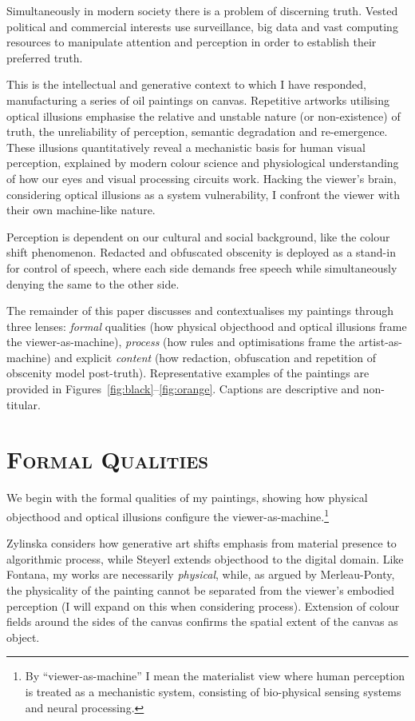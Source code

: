 \documentclass[12pt]{article}
\begin{document}
Simultaneously in modern society there is a problem of discerning
truth.\autocite{keyes2004posttruth,mcintyre2018posttruth} Vested
political and commercial interests use surveillance, big data and vast
computing resources to manipulate attention and perception in order to
establish their preferred truth.

This is the intellectual and generative context to which I have
responded, manufacturing a series of oil paintings on
canvas. Repetitive artworks utilising optical illusions emphasise the
relative and unstable nature (or non-existence) of truth, the
unreliability of perception, semantic degradation and
re-emergence. These illusions quantitatively reveal a mechanistic
basis for human visual perception, explained by modern colour science
and physiological understanding of how our eyes and visual processing
circuits work. Hacking the viewer's brain, considering optical
illusions as a system vulnerability, I confront the viewer with their
own machine-like nature.

Perception is dependent on our cultural and social background, like
the colour shift phenomenon. Redacted and obfuscated obscenity is
deployed as a stand-in for control of speech, where each side demands
free speech while simultaneously denying the same to the other side.

The remainder of this paper discusses and contextualises my paintings
through three lenses: \emph{formal} qualities (how physical objecthood
and optical illusions frame the viewer-as-machine), \emph{process}
(how rules and optimisations frame the artist-as-machine) and
explicit \emph{content} (how redaction, obfuscation and repetition of
obscenity model post-truth). Representative examples of the paintings
are provided in Figures~\ref{fig:black}--\ref{fig:orange}. Captions
are descriptive and non-titular.

\section{\textsc{Formal Qualities}}
We begin with the formal qualities of my paintings, showing how
physical objecthood and optical illusions configure the
viewer-as-machine.\footnote{By ``viewer-as-machine'' I mean the
  materialist view where human perception is treated as a mechanistic
  system, consisting of bio-physical sensing systems and neural
  processing.}


Zylinska considers how generative art shifts emphasis from material
presence to algorithmic process,\autocite{zylinska2020ai} while Steyerl
extends objecthood to the digital domain.\autocite{steyerl2017duty} Like
Fontana, my works are necessarily
\emph{physical},\autocite{fontana1947spatial} while, as argued by
Merleau-Ponty, the physicality of the painting cannot be separated
from the viewer's embodied perception (I will expand on this when
considering process).\autocite{merleauponty1964eye} Extension of colour
fields around the sides of the canvas confirms the spatial extent of
the canvas as object.
\end{document}

